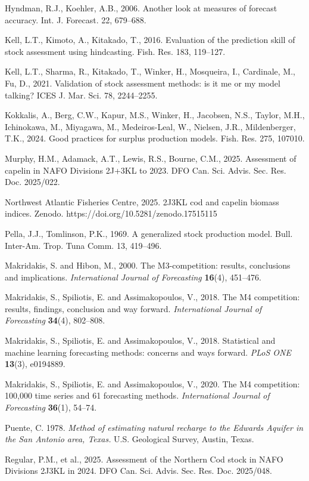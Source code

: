 \documentclass[11pt]{article}
\begin{document}
Hyndman, R.J., Koehler, A.B., 2006. Another look at measures of forecast
accuracy. Int. J. Forecast. 22, 679--688.

Kell, L.T., Kimoto, A., Kitakado, T., 2016. Evaluation of the prediction
skill of stock assessment using hindcasting. Fish. Res. 183, 119--127.

Kell, L.T., Sharma, R., Kitakado, T., Winker, H., Mosqueira, I.,
Cardinale, M., Fu, D., 2021. Validation of stock assessment methods: is
it me or my model talking? ICES J. Mar. Sci. 78, 2244--2255.

Kokkalis, A., Berg, C.W., Kapur, M.S., Winker, H., Jacobsen, N.S.,
Taylor, M.H., Ichinokawa, M., Miyagawa, M., Medeiros-Leal, W., Nielsen,
J.R., Mildenberger, T.K., 2024. Good practices for surplus production
models. Fish. Res. 275, 107010.


Murphy, H.M., Adamack, A.T., Lewis, R.S., Bourne, C.M., 2025. Assessment
of capelin in NAFO Divisions 2J+3KL to 2023. DFO Can. Sci. Advis. Sec.
Res. Doc. 2025/022.

Northwest Atlantic Fisheries Centre, 2025. 2J3KL cod and capelin biomass
indices. Zenodo. https://doi.org/10.5281/zenodo.17515115

Pella, J.J., Tomlinson, P.K., 1969. A generalized stock production
model. Bull. Inter-Am. Trop. Tuna Comm. 13, 419--496.

Makridakis, S. and Hibon, M., 2000. The M3-competition: results, conclusions and implications.
\emph{International Journal of Forecasting} \textbf{16}(4), 451--476.

Makridakis, S., Spiliotis, E. and Assimakopoulos, V., 2018. The M4 competition: results,
findings, conclusion and way forward. \emph{International Journal of Forecasting}
\textbf{34}(4), 802--808.

Makridakis, S., Spiliotis, E. and Assimakopoulos, V., 2018. Statistical and machine learning
forecasting methods: concerns and ways forward. \emph{PLoS ONE} \textbf{13}(3), e0194889.

Makridakis, S., Spiliotis, E. and Assimakopoulos, V., 2020. The M4 competition: 100,000 time
series and 61 forecasting methods. \emph{International Journal of Forecasting} \textbf{36}(1),
54--74.

Puente, C. 1978. \emph{Method of estimating natural recharge to the
Edwards Aquifer in the San Antonio area, Texas.} U.S. Geological Survey,
Austin, Texas.

Regular, P.M., et al., 2025. Assessment of the Northern Cod stock in
NAFO Divisions 2J3KL in 2024. DFO Can. Sci. Advis. Sec. Res. Doc.
2025/048.
\end{document}
